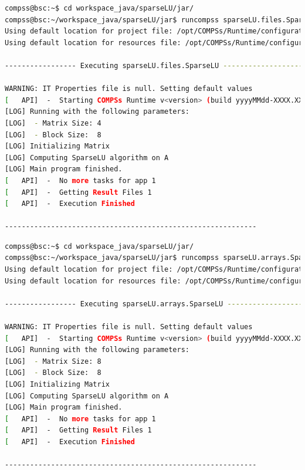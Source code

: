 \begin{lstlisting}[language=bash]
compss@bsc:~$ cd workspace_java/sparseLU/jar/
compss@bsc:~/workspace_java/sparseLU/jar$ runcompss sparseLU.files.SparseLU 4 8
Using default location for project file: /opt/COMPSs/Runtime/configuration/xml/projects/project.xml
Using default location for resources file: /opt/COMPSs/Runtime/configuration/xml/resources/resources.xml

----------------- Executing sparseLU.files.SparseLU --------------------------

WARNING: IT Properties file is null. Setting default values
[   API]  -  Starting COMPSs Runtime v<version> (build yyyyMMdd-XXXX.XXXX)
[LOG] Running with the following parameters:
[LOG]  - Matrix Size: 4
[LOG]  - Block Size:  8
[LOG] Initializing Matrix
[LOG] Computing SparseLU algorithm on A
[LOG] Main program finished.
[   API]  -  No more tasks for app 1
[   API]  -  Getting Result Files 1
[   API]  -  Execution Finished

------------------------------------------------------------
\end{lstlisting}

\begin{lstlisting}[language=bash]
compss@bsc:~$ cd workspace_java/sparseLU/jar/
compss@bsc:~/workspace_java/sparseLU/jar$ runcompss sparseLU.arrays.SparseLU 8 8
Using default location for project file: /opt/COMPSs/Runtime/configuration/xml/projects/project.xml
Using default location for resources file: /opt/COMPSs/Runtime/configuration/xml/resources/resources.xml

----------------- Executing sparseLU.arrays.SparseLU --------------------------

WARNING: IT Properties file is null. Setting default values
[   API]  -  Starting COMPSs Runtime v<version> (build yyyyMMdd-XXXX.XXXX)
[LOG] Running with the following parameters:
[LOG]  - Matrix Size: 8
[LOG]  - Block Size:  8
[LOG] Initializing Matrix
[LOG] Computing SparseLU algorithm on A
[LOG] Main program finished.
[   API]  -  No more tasks for app 1
[   API]  -  Getting Result Files 1
[   API]  -  Execution Finished

------------------------------------------------------------
\end{lstlisting}




